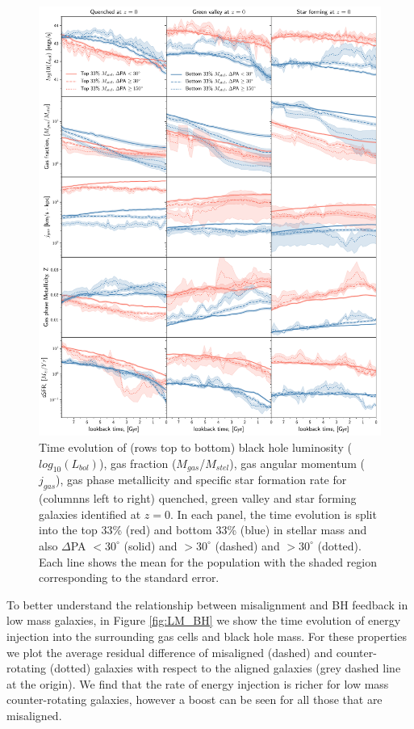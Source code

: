 \documentclass[fleqn,usenatbib]{mnras}
\begin{document}
\begin{figure}
	\includegraphics[width=0.9\linewidth]{overall_population/overall_pop_evolution.pdf}
    \caption{Time evolution of (rows top to bottom) black hole luminosity ($log_{10}(L_{bol})$), gas fraction ($M_{gas}$/$M_{stel}$), gas angular momentum ($j_{gas}$), gas phase metallicity and specific star formation rate for (columnns left to right) quenched, green valley and star forming galaxies identified at $z=0$. In each panel, the time evolution is split into the top 33\% (red) and bottom 33\% (blue) in stellar mass and also $\Delta$PA $< 30^{\circ}$ (solid) and $> 30^{\circ}$ (dashed) and  $> 30^{\circ}$ (dotted). Each line shows the mean for the population with the shaded region corresponding to the standard error.}
    \label{fig:overall_pop}
\end{figure}

To better understand the relationship between misalignment and BH feedback in low mass galaxies, in Figure \ref{fig:LM_BH} we show the time evolution of energy injection into the surrounding gas cells and black hole mass. For these properties we plot the average residual difference of misaligned (dashed) and counter-rotating (dotted) galaxies with respect to the aligned galaxies (grey dashed line at the origin). We find that the rate of energy injection is richer for low mass counter-rotating galaxies, however a boost can be seen for all those that are misaligned.
\end{document}
